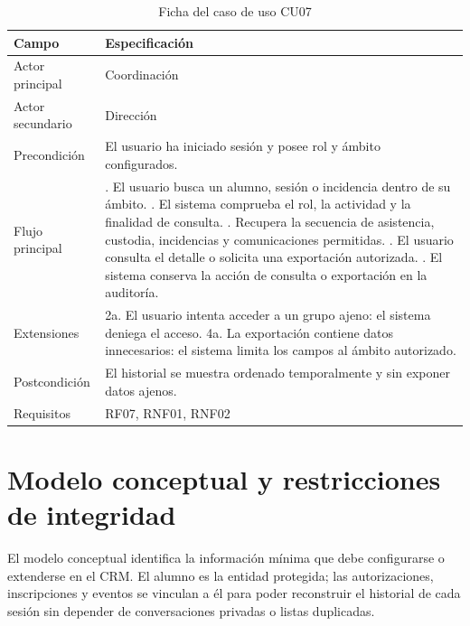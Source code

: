 \begin{table}[H]
\centering\small
\begin{tabularx}{\textwidth}{>{\hsize=0.381\hsize\raggedright\arraybackslash}X>{\hsize=1.619\hsize\raggedright\arraybackslash}X}
\toprule
\rowcolor{cabeceratabla} \textbf{Campo} & \textbf{Especificación} \\
\midrule
Actor principal & Coordinación \\
Actor secundario & Dirección \\
Precondición & El usuario ha iniciado sesión y posee rol y ámbito configurados. \\
Flujo principal & 1. El usuario busca un alumno, sesión o incidencia dentro de su ámbito. \newline 2. El sistema comprueba el rol, la actividad y la finalidad de consulta. \newline 3. Recupera la secuencia de asistencia, custodia, incidencias y comunicaciones permitidas. \newline 4. El usuario consulta el detalle o solicita una exportación autorizada. \newline 5. El sistema conserva la acción de consulta o exportación en la auditoría. \\
Extensiones & 2a. El usuario intenta acceder a un grupo ajeno: el sistema deniega el acceso. \newline 4a. La exportación contiene datos innecesarios: el sistema limita los campos al ámbito autorizado. \\
Postcondición & El historial se muestra ordenado temporalmente y sin exponer datos ajenos. \\
Requisitos & RF07, RNF01, RNF02 \\
\bottomrule
\end{tabularx}
\caption{Ficha del caso de uso CU07}\label{tab:31}
\end{table}

\section{Modelo conceptual y restricciones de integridad}\label{sec:4-2}

El modelo conceptual identifica la información mínima que debe configurarse o extenderse en el CRM. El alumno es la entidad protegida; las autorizaciones, inscripciones y eventos se vinculan a él para poder reconstruir el historial de cada sesión sin depender de conversaciones privadas o listas duplicadas.

